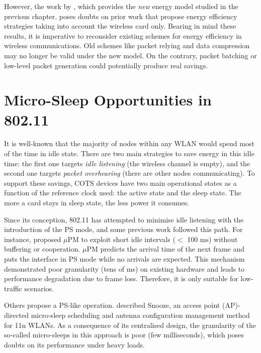 \documentclass[twoside,nohyper]{tufte-book}
\theoremstyle{definition}
\theoremstyle{definition}
\theoremstyle{definition}
\theoremstyle{remark}
\begin{document}
However, the work by \citet{Serrano2014}, which provides the \emph{new}
energy model studied in the previous chapter, poses doubts on prior work
that propose energy efficiency strategies taking into account the
wireless card only. Bearing in mind these results, it is imperative to
reconsider existing schemes for energy efficiency in wireless
communications. Old schemes like packet relying \citep{He2010} and data
compression \citep{Baek2004, Sharma2009} may no longer be valid under
the new model. On the contrary, packet batching or low-level packet
generation could potentially produce real savings.

\hypertarget{micro-sleep-opportunities-in-802.11-1}{%
\section{Micro-Sleep Opportunities in
802.11}\label{micro-sleep-opportunities-in-802.11-1}}

It is well-known that the majority of nodes within any WLAN would spend
most of the time in idle state. There are two main strategies to save
energy in this idle time: the first one targets \emph{idle listening}
(the wireless channel is empty), and the second one targets \emph{packet
overhearing} (there are other nodes communicating). To support these
savings, COTS devices have two main operational states as a function of
the reference clock used: the active state and the sleep state. The more
a card stays in sleep state, the less power it consumes.

Since its conception, 802.11 has attempted to minimise idle listening
with the introduction of the PS mode, and some previous work followed
this path. For instance, \citet{Liu2008} proposed \(\mu\)PM to exploit
short idle intervals (\(<\) 100 ms) without buffering or cooperation.
\(\mu\)PM predicts the arrival time of the next frame and puts the
interface in PS mode while no arrivals are expected. This mechanism
demonstrated poor granularity (tens of ms) on existing hardware and
leads to performance degradation due to frame loss. Therefore, it is
only suitable for low-traffic scenarios.

Others propose a PS-like operation. \citet{Jang2011} described Snooze,
an access point (AP)-directed micro-sleep scheduling and antenna
configuration management method for 11n WLANs. As a consequence of its
centralised design, the granularity of the so-called micro-sleeps in
this approach is poor (few milliseconds), which poses doubts on its
performance under heavy loads.
\end{document}
